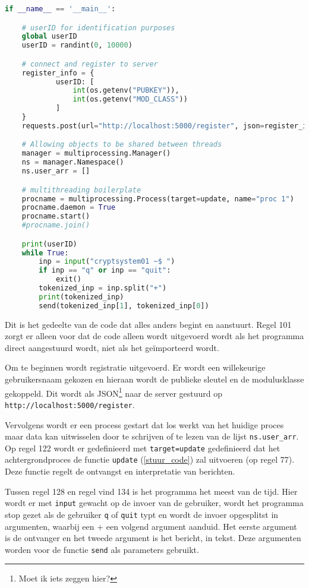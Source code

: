 \documentclass{report} %
\let\code\lstinline
\begin{document}
\begin{lstlisting}[language=Python, firstnumber=101]
if __name__ == '__main__':

    # userID for identification purposes
    global userID
    userID = randint(0, 10000)

    # connect and register to server
    register_info = {
            userID: [
                int(os.getenv("PUBKEY")),
                int(os.getenv("MOD_CLASS"))
            ]
    }
    requests.post(url="http://localhost:5000/register", json=register_info)

    # Allowing objects to be shared between threads
    manager = multiprocessing.Manager()
    ns = manager.Namespace()
    ns.user_arr = []

    # multithreading boilerplate
    procname = multiprocessing.Process(target=update, name="proc 1")
    procname.daemon = True
    procname.start()
    #procname.join()

    print(userID)
    while True:
        inp = input("cryptsystem01 ~$ ")
        if inp == "q" or inp == "quit":
            exit()
        tokenized_inp = inp.split("+")
        print(tokenized_inp)
        send(tokenized_inp[1], tokenized_inp[0])
\end{lstlisting}
Dit is het gedeelte van de code dat alles anders begint en aanstuurt. Regel 101 zorgt er alleen voor dat de code alleen wordt uitgevoerd wordt als het programma direct aangestuurd wordt, niet als het geïmporteerd wordt.
\par Om te beginnen wordt registratie uitgevoerd. Er wordt een willekeurige gebruikersnaam gekozen en hieraan wordt de publieke sleutel en de modulusklasse gekoppeld. Dit wordt als JSON\footnote{Moet ik iets zeggen hier?} naar de server gestuurd op \code{http://localhost:5000/register}.
\par Vervolgens wordt er een process gestart dat los werkt van het huidige proces maar data kan uitwisselen door te schrijven of te lezen van de lijst \code{ns.user_arr}. Op regel 122 wordt er gedefinieerd met \code{target=update} gedefinieerd dat het achtergrondproces de functie \code{update} (\ref{stuur_code}) zal uitvoeren (op regel 77). Deze functie regelt de ontvangst en interpretatie van berichten.
\par Tussen regel 128 en regel vind 134 is het programma het meest van de tijd. Hier wordt er met \code{input} gewacht op de invoer van de gebruiker, wordt het programma stop gezet als de gebruiker \code{q} of \code{quit} typt en wordt de invoer opgesplitst in argumenten, waarbij een + een volgend argument aanduid. Het eerste argument is de ontvanger en het tweede argument is het bericht, in tekst. Deze argumenten worden voor de functie \code{send} als parameters gebruikt. \\
\end{document}
